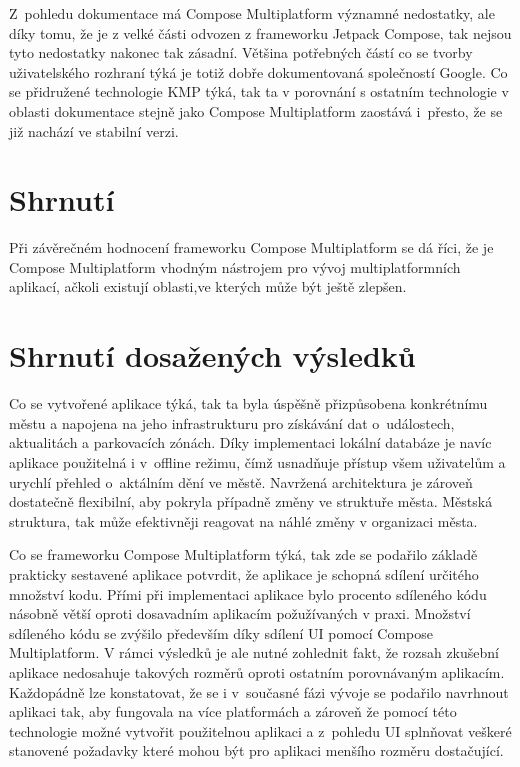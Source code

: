
Z~pohledu dokumentace má Compose Multiplatform významné nedostatky, ale díky tomu, že je z velké části odvozen z frameworku Jetpack Compose,
tak nejsou tyto nedostatky nakonec tak zásadní. Většina potřebných částí co se tvorby uživatelského rozhraní týká je totiž dobře dokumentovaná 
společností Google. Co se přidružené technologie KMP týká, tak ta v porovnání s ostatním technologie v oblasti dokumentace stejně jako Compose 
Multiplatform zaostává i~přesto, že se již nachází ve stabilní verzi.


\section*{Shrnutí}
Při závěrečném hodnocení frameworku Compose Multiplatform se dá říci, že
je Compose Multiplatform vhodným nástrojem pro vývoj multiplatformních aplikací, ačkoli existují oblasti,ve kterých může být ještě zlepšen.


\section{Shrnutí dosažených výsledků}
Co se vytvořené aplikace týká, tak ta byla úspěšně přizpůsobena konkrétnímu městu a napojena na jeho infrastrukturu pro získávání dat 
o~událostech, aktualitách a parkovacích zónách. Díky implementaci lokální databáze je navíc aplikace použitelná i v~offline režimu, čímž 
usnadňuje přístup všem uživatelům a urychlí přehled o~aktálním dění ve městě. Navržená architektura je zároveň dostatečně flexibilní, 
aby pokryla případně změny ve struktuře města. Městská struktura, tak může efektivněji reagovat na náhlé změny v organizaci města.

Co se frameworku Compose Multiplatform týká, tak zde se podařilo základě prakticky sestavené aplikace potvrdit, že aplikace je schopná 
sdílení určitého množství kodu. Přími při implementaci aplikace bylo procento sdíleného kódu násobně větší oproti dosavadním aplikacím
požužívaných v praxi. Množství sdíleného kódu se zvýšilo především díky sdílení UI pomocí Compose Multiplatform. 
V rámci výsledků je ale nutné zohlednit fakt, že rozsah zkušební aplikace nedosahuje 
takových rozměrů oproti ostatním porovnávaným aplikacím. Každopádně lze konstatovat, že se i v~současné fázi vývoje se podařilo navrhnout
aplikaci tak, aby fungovala na více platformách a zároveň že pomocí této technologie možné vytvořit použitelnou aplikaci a z~pohledu UI 
splnňovat veškeré stanovené požadavky které mohou být pro aplikaci menšího rozměru dostačující.

